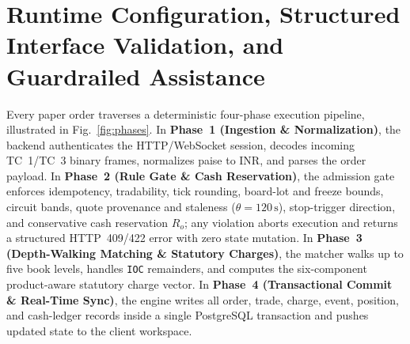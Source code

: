 \documentclass[12pt]{article}
\newcommand{\thinunit}[2]{#1\,\text{#2}}
\begin{document}
\section{Runtime Configuration, Structured Interface Validation, and Guardrailed Assistance}

Every paper order traverses a deterministic four-phase execution pipeline, illustrated in Fig.~\ref{fig:phases}. In \textbf{Phase~1 (Ingestion \& Normalization)}, the backend authenticates the HTTP/WebSocket session, decodes incoming TC~1/TC~3 binary frames, normalizes paise to INR, and parses the order payload. In \textbf{Phase~2 (Rule Gate \& Cash Reservation)}, the admission gate enforces idempotency, tradability, tick rounding, board-lot and freeze bounds, circuit bands, quote provenance and staleness ($\theta=\thinunit{120}{s}$), stop-trigger direction, and conservative cash reservation $R_o$; any violation aborts execution and returns a structured HTTP~409/422 error with zero state mutation. In \textbf{Phase~3 (Depth-Walking Matching \& Statutory Charges)}, the matcher walks up to five book levels, handles \texttt{IOC} remainders, and computes the six-component product-aware statutory charge vector. In \textbf{Phase~4 (Transactional Commit \& Real-Time Sync)}, the engine writes all order, trade, charge, event, position, and cash-ledger records inside a single PostgreSQL transaction and pushes updated state to the client workspace.
\end{document}
